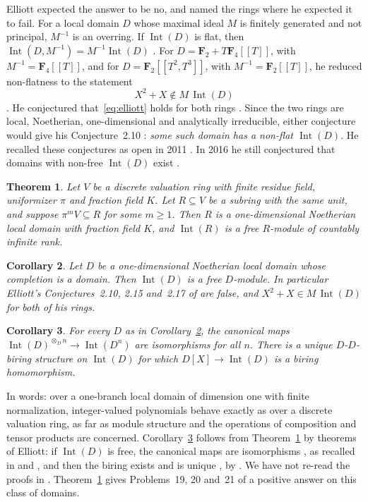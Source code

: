 \documentclass[11pt,a4paper]{article}
\theoremstyle{plain}
\newtheorem{theorem}{Theorem}
\newtheorem{corollary}[theorem]{Corollary}
\theoremstyle{remark}
\newcommand{\F}{\mathbf F}
\newcommand{\Int}{\operatorname{Int}}
\begin{document}
Elliott expected the answer to be no, and named the rings where he expected it to fail. For a local domain $D$ whose
maximal ideal $M$ is finitely generated and not principal, $M^{-1}$ is an overring. If $\Int(D)$ is flat, then
$\Int(D,M^{-1})=M^{-1}\Int(D)$ \cite[Proposition~2.13, p.~12]{E11a}. For $D=\F_2+T\F_4[[T]]$, with $M^{-1}=\F_4[[T]]$,
and for $D=\F_2[[T^2,T^3]]$, with $M^{-1}=\F_2[[T]]$, he reduced non-flatness to the statement
\begin{equation}\label{eq:elliott}
 X^2+X\notin M\,\Int(D)
\end{equation}
\cite[Propositions~2.14 and~2.16, p.~12]{E11a}. He conjectured that~\eqref{eq:elliott} holds for both rings
\cite[Conjectures~2.15 and~2.17]{E11a}. Since the two rings are local, Noetherian, one-dimensional and
analytically irreducible, either conjecture would give his Conjecture~2.10 \cite[p.~11]{E11a}: \emph{some such domain
has a non-flat $\Int(D)$}. He recalled these conjectures as open in 2011 \cite[p.~2]{E11b}. In 2016 he still
conjectured that domains with non-free $\Int(D)$ exist \cite[p.~2]{E16b}.

\begin{theorem}\label{thm:main}
Let $V$ be a discrete valuation ring with finite residue field, uniformizer $\pi$ and fraction field $K$. Let
$R\subseteq V$ be a subring with the same unit, and suppose $\pi^mV\subseteq R$ for some $m\geq1$. Then $R$ is a
one-dimensional Noetherian local domain with fraction field $K$, and $\Int(R)$ is a free $R$-module of countably
infinite rank.
\end{theorem}

\begin{corollary}\label{cor:ai}
Let $D$ be a one-dimensional Noetherian local domain whose completion is a domain. Then $\Int(D)$ is a free
$D$-module. In particular Elliott's Conjectures~2.10, 2.15 and~2.17 of \cite{E11a} are false, and
$X^2+X\in M\,\Int(D)$ for both of his rings.
\end{corollary}

\begin{corollary}\label{cor:biring}
For every $D$ as in Corollary~\ref{cor:ai}, the canonical maps $\Int(D)^{\otimes_D n}\to\Int(D^n)$ are isomorphisms
for all $n$. There is a unique $D$-$D$-biring structure on $\Int(D)$ for which $D[X]\to\Int(D)$ is a biring
homomorphism.
\end{corollary}

In words: over a one-branch local domain of dimension one with finite normalization, integer-valued polynomials
behave exactly as over a discrete valuation ring, as far as module structure and the operations of composition and
tensor products are concerned. Corollary~\ref{cor:biring} follows from Theorem~\ref{thm:main} by theorems of Elliott:
if $\Int(D)$ is free, the canonical maps are isomorphisms \cite[Propositions~6.8(a), 6.10(d)]{E07}, as recalled in
\cite[p.~9]{CFFG} and \cite[p.~16]{E11b}, and then the biring exists and is unique \cite[p.~10]{CFFG}, by
\cite{E10}. We have not re-read the proofs in \cite{E07,E10}. Theorem~\ref{thm:main} gives Problems~19, 20 and~21
of \cite{CFFG} a positive answer on this class of domains.
\end{document}
